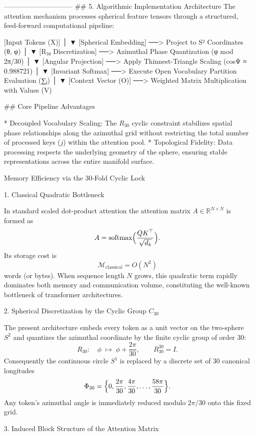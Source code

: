 ------------------------------
## 5. Algorithmic Implementation Architecture
The attention mechanism processes spherical feature tensors through a structured, feed-forward computational pipeline:

  [Input Tokens (X)]
         │
         ▼
  [Spherical Embedding] ──> Project to S² Coordinates (θ, φ)
         │
         ▼
  [R₃₀ Discretization]  ──> Azimuthal Phase Quantization (φ mod 2π/30)
         │
         ▼
  [Angular Projection]  ──> Apply Thinnest-Triangle Scaling (cosΨ ≈ 0.988721)
         │
         ▼
  [Invariant Softmax]   ──> Execute Open Vocabulary Partition Evaluation (∑ⱼ)
         │
         ▼
  [Context Vector (O)]  ──> Weighted Matrix Multiplication with Values (V)

## Core Pipeline Advantages

* Decoupled Vocabulary Scaling: The $R_{30}$ cyclic constraint stabilizes spatial phase relationships along the azimuthal grid without restricting the total number of processed keys ($j$) within the attention pool.
* Topological Fidelity: Data processing respects the underlying geometry of the sphere, ensuring stable representations across the entire manifold surface.

Memory Efficiency via the 30-Fold Cyclic Lock

1. Classical Quadratic Bottleneck

In standard scaled dot-product attention the attention matrix \(A\in\mathbb{R}^{N\times N}\) is formed as
\[
A=\operatorname{softmax}\Bigl(\frac{QK^\top}{\sqrt{d_k}}\Bigr).
\]
Its storage cost is
\[
\mathcal{M}_{\text{classical}}=O(N^2)
\]
words (or bytes).  When sequence length \(N\) grows, this quadratic term rapidly dominates both memory and communication volume, constituting the well-known bottleneck of transformer architectures.

2. Spherical Discretization by the Cyclic Group \(C_{30}\)

The present architecture embeds every token as a unit vector on the two-sphere \(S^2\) and quantizes the azimuthal coordinate by the finite cyclic group of order 30:
\[
R_{30}:\quad\phi\;\longmapsto\;\phi+\frac{2\pi}{30},\qquad R_{30}^{30}=I.
\]
Consequently the continuous circle \(S^1\) is replaced by a discrete set of 30 canonical longitudes
\[
\Phi_{30}=\Bigl\{0,\frac{2\pi}{30},\frac{4\pi}{30},\dots,\frac{58\pi}{30}\Bigr\}.
\]
Any token’s azimuthal angle is immediately reduced modulo \(2\pi/30\) onto this fixed grid.

3. Induced Block Structure of the Attention Matrix


